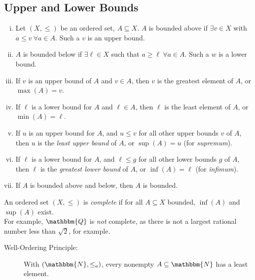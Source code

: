 \documentclass[10pt]{extarticle}
\newcommand{\N}{\mathbbm{N}}
\newcommand{\Q}{\mathbbm{Q}}
\begin{document}
      \subsection{Upper and Lower Bounds}%
        \begin{enumerate}[(i)]
          \item Let $(X,\leq)$ be an ordered set, $A\subseteq X$. $A$ is bounded above if $\exists v\in X$ with $a\leq v~\forall a\in A$. Such a $v$ is an upper bound.
          \item $A$ is bounded below if $\exists \ell\in X$ such that $a\geq \ell~\forall a\in A$. Such a $w$ is a lower bound.
          \item If $v$ is an upper bound of $A$ and $v\in A$, then $v$ is the greatest element of $A$, or $\max(A) = v$.
          \item If $\ell$ is a lower bound for $A$ and $\ell\in A$, then $\ell$ is the least element of $A$, or $\min(A) = \ell$.
          \item If $u$ is an upper bound for $A$, and $u \leq v$ for all other upper bounds $v$ of $A$, then $u$ is the \textsl{least upper bound} of $A$, or $\sup(A) = u$ (for \textit{supremum}).
          \item If $\ell$ is a lower bound for $A$, and $\ell \leq g$ for all other lower bounds $g$ of $A$, then $\ell$ is the \textsl{greatest lower bound} of $A$, or $\inf(A) = \ell$ (for \textit{infimum}).
          \item If $A$ is bounded above and below, then $A$ is bounded.
        \end{enumerate}
        An ordered set $(X,\leq)$ is \textsl{complete} if for all $A\subseteq X$ bounded, $\inf(A)$ and $\sup(A)$ exist.\\

        For example, $\Q$ is \textsl{not} complete, as there is not a largest rational number less than $\sqrt{2}$, for example.
        \begin{description}
          \item[Well-Ordering Principle:] With $(\N,\leq_a)$, every nonempty $A\subseteq \N$ has a least element.
        \end{description}
\end{document}
